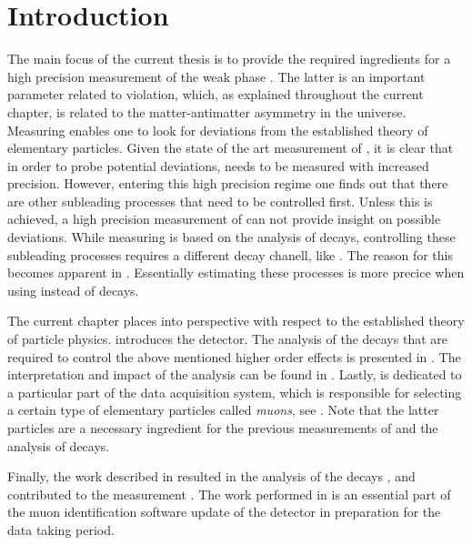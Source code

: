 
\chapter{Introduction}
\label{Introduction}

The main focus of the current thesis is to provide the required ingredients for a high precision measurement of
the weak phase \phis. The latter is an important parameter related to \CP violation, which, as explained throughout
the current chapter, is related to the matter-antimatter asymmetry in the universe. Measuring \phis enables one to look
for deviations from the established theory of elementary particles. Given the state of the art measurement of \phis \cite{phis-3fb-paper},
it is clear that in order to probe potential deviations, \phis needs to be measured with increased precision.
However, entering this high precision regime one finds out that there are other subleading processes that need to be
controlled first. Unless this is achieved, a high precision measurement of \phis can not provide insight on possible
deviations. While measuring \phis is based on the analysis of \BsJpsiPhi decays, controlling these subleading processes
requires a different decay chanell, like \BsJpsiKst. The reason for this becomes apparent in .
Essentially estimating these processes is more precice when using \BsJpsiKst instead of \BsJpsiPhi decays.

The current chapter places \phis into perspective with respect to the established theory of particle physics.
 introduces the \lhcb detector. The analysis of the \BsJpsiKst decays that are
required to control the above mentioned higher order effects is presented in .
The interpretation and impact of the analysis can be found in .
Lastly,  is dedicated to a particular part of the \lhcb data acquisition system,
which is responsible for selecting a certain type of elementary particles called {\it muons}, see .
Note that the latter particles are a necessary ingredient for the previous measurements of \phis and
the analysis of \BsJpsiKst decays.

Finally, the work described in  resulted in the analysis of the \BsJpsiKst
decays \cite{bsjpsikst-paper}, and contributed to the \phis measurement \cite{phis-3fb-paper}.
The work performed in  is an essential part of the muon identification
software update \cite{Albrecht:2253050} of the \lhcb detector in preparation for the \runtwo data taking period.

